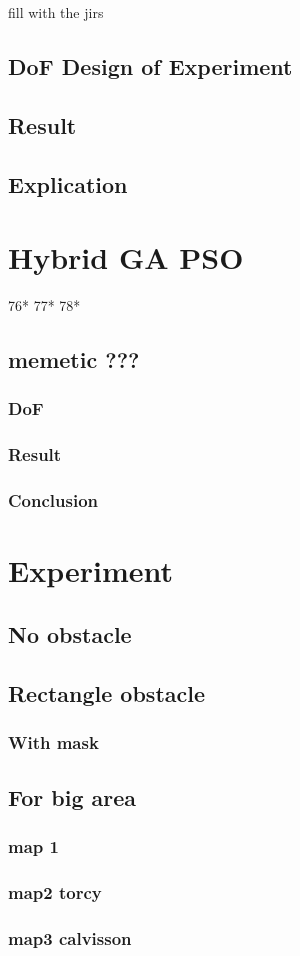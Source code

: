fill with the jirs 
	\subsection{DoF Design of Experiment}
	\subsection{Result}
	\subsection{Explication}

\section{Hybrid GA PSO}
 76* 77* 78*
	\subsection{memetic ???}
		\subsubsection{DoF}
		\subsubsection{Result}
		\subsubsection{Conclusion}
		
\section{Experiment}
	\subsection{No obstacle }
	\subsection{Rectangle obstacle}
	\subsubsection{With mask}
	\subsection{For big area}
		\subsubsection{map 1}
		\subsubsection{map2 torcy}
		\subsubsection{map3 calvisson}
		



 


